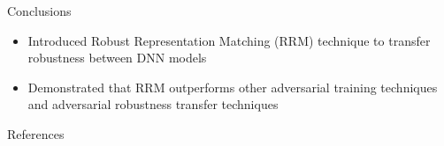 \documentclass{beamer}
\begin{document}

\begin{frame}{Conclusions}
	
	\begin{itemize}
		\item Introduced Robust Representation Matching (RRM) technique to transfer robustness between DNN models
		\item Demonstrated that RRM outperforms other adversarial training techniques and adversarial robustness transfer techniques
	\end{itemize}
	
\end{frame}


\begin{frame}{References}
	
	
	
	
\end{frame}
\end{document}
